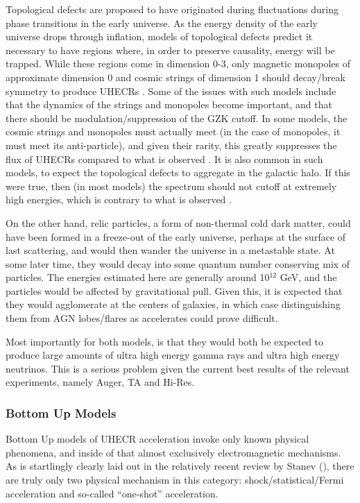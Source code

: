 Topological defects are proposed to have originated during fluctuations during phase transitions in the early universe. As the energy density of the early universe drops through inflation, models of topological defects predict it necessary to have regions where, in order to preserve causality, energy will be trapped. While these regions come in dimension 0-3, only magnetic monopoles of approximate dimension 0 and cosmic strings of dimension 1 should decay/break symmetry to produce UHECRs \cite{stanev}. Some of the issues with such models include that the dynamics of the strings and monopoles become important, and that there should be modulation/suppression of the GZK cutoff. In some models, the cosmic strings and monopoles must actually meet (in the case of monopoles, it must meet its anti-particle), and given their rarity, this greatly suppresses the flux of UHECRs compared to what is observed \cite{tds}. It is also common in such models, to expect the topological defects to aggregate in the galactic halo. If this were true, then (in most models) the spectrum should not cutoff at extremely high energies, which is contrary to what is observed \cite{swordyplot}.

On the other hand, relic particles, a form of non-thermal cold dark matter, could have been formed in a freeze-out of the early universe, perhaps at the surface of last scattering, and would then wander the universe in a metastable state. At some later time, they would decay into some quantum number conserving mix of particles. The energies estimated here are generally around 10$^{12}$ GeV, and the particles would be affected by gravitational pull. Given this, it is expected that they would agglomerate at the centers of galaxies, in which case distinguishing them from AGN lobes/flares as accelerates could prove difficult. 

Most importantly for both models, is that they would both be expected to produce large amounts of ultra high energy gamma rays and ultra high energy neutrinos. This is a serious problem given the current best results of the relevant experiments, namely Auger, TA and Hi-Res\cite{futuregzk,foteini}. 
\subsubsection{Bottom Up Models}
\label{bottomups}
Bottom Up models of UHECR acceleration invoke only known physical phenomena, and inside of that almost exclusively electromagnetic mechanisms. As is startlingly clearly laid out in the relatively recent review by Stanev (\cite{stanev}), there are truly only two physical mechanism in this category: shock/statistical/Fermi acceleration and so-called ``one-shot'' acceleration. 

